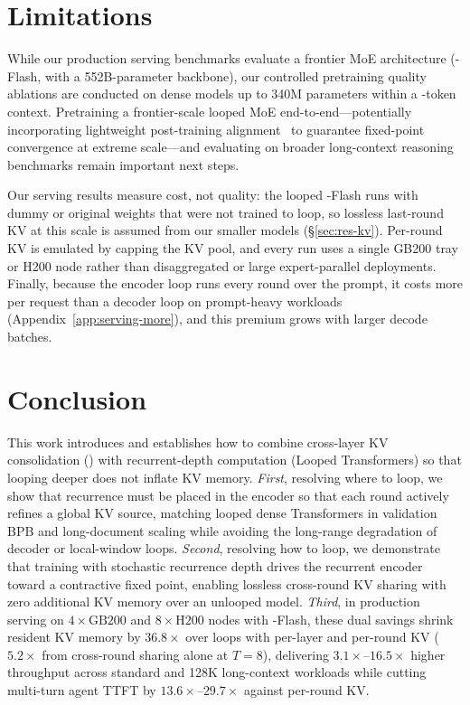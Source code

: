 \section{Limitations}
\label{sec:limitations}

While our production serving benchmarks evaluate a frontier MoE architecture (\vfour-Flash, with a 552B-parameter backbone), our controlled pretraining quality ablations are conducted on dense models up to 340M parameters within a -token context. Pretraining a frontier-scale looped \ced MoE end-to-end—potentially incorporating lightweight post-training alignment~\citep{benice} to guarantee fixed-point convergence at extreme scale—and evaluating on broader long-context reasoning benchmarks remain important next steps.

Our serving results measure cost, not quality: the looped \vfour-Flash runs with dummy or original weights that were not trained to loop, so lossless last-round KV at this scale is assumed from our smaller models (\S\ref{sec:res-kv}). Per-round KV is emulated by capping the KV pool, and every run uses a single GB200 tray or H200 node rather than disaggregated or large expert-parallel deployments. Finally, because the encoder loop runs every round over the prompt, it costs more per request than a decoder loop on prompt-heavy workloads (Appendix~\ref{app:serving-more}), and this premium grows with larger decode batches.

\section{Conclusion}
\label{sec:conclusion}

This work introduces \ourmethod and establishes how to combine cross-layer KV consolidation (\ced) with recurrent-depth computation (Looped Transformers) so that looping deeper does not inflate KV memory. \textit{First}, resolving where to loop, we show that recurrence must be placed in the \ced encoder so that each round actively refines a global KV source, matching looped dense Transformers in validation BPB and long-document scaling while avoiding the long-range degradation of decoder or local-window loops. \textit{Second}, resolving how to loop, we demonstrate that training with stochastic recurrence depth drives the recurrent encoder toward a contractive fixed point, enabling lossless cross-round KV sharing with zero additional KV memory over an unlooped model. \textit{Third}, in production serving on $4\times\text{GB200}$ and $8\times\text{H200}$ nodes with \vfour-Flash, these dual savings shrink resident KV memory by $36.8\times$ over loops with per-layer and per-round KV ($5.2\times$ from cross-round sharing alone at $T=8$), delivering $3.1\times$--$16.5\times$ higher throughput across standard and 128K long-context workloads while cutting multi-turn agent TTFT by $13.6\times$--$29.7\times$ against per-round KV.
